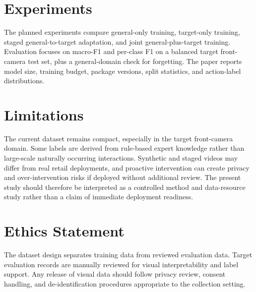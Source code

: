 \documentclass[11pt]{article}
\begin{document}


\section{Experiments}

The planned experiments compare general-only training, target-only training, staged general-to-target adaptation, and joint general-plus-target training. Evaluation focuses on macro-F1 and per-class F1 on a balanced target front-camera test set, plus a general-domain check for forgetting. The paper reports model size, training budget, package versions, split statistics, and action-label distributions.

\section{Limitations}

The current dataset remains compact, especially in the target front-camera domain. Some labels are derived from rule-based expert knowledge rather than large-scale naturally occurring interactions. Synthetic and staged videos may differ from real retail deployments, and proactive intervention can create privacy and over-intervention risks if deployed without additional review. The present study should therefore be interpreted as a controlled method and data-resource study rather than a claim of immediate deployment readiness.

\section{Ethics Statement}

The dataset design separates training data from reviewed evaluation data. Target evaluation records are manually reviewed for visual interpretability and label support. Any release of visual data should follow privacy review, consent handling, and de-identification procedures appropriate to the collection setting.
\end{document}
